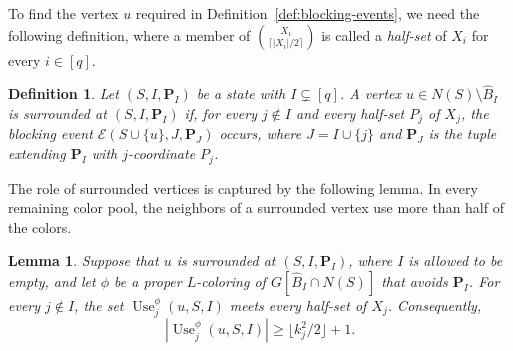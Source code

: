 \documentclass[10pt,a4paper]{amsart}
\numberwithin{equation}{section}
\newtheorem{lemma}[theorem]{Lemma}
\newtheorem{definition}[theorem]{Definition}
\newcommand{\Use}{\operatorname{Use}}
\begin{document}
To find the vertex $u$ required in
Definition~\ref{def:blocking-events}, we need the following definition,
where a member of
$\binom{X_i}{\lceil |X_i|/2\rceil}$ is called a \emph{half-set} of $X_i$
for every $i\in[q]$.

\begin{definition}\label{def:surrounded}
Let $(S,I,\mathbf{P}_I)$ be a state with $I \subsetneq [q]$. A vertex
$u \in N(S) \setminus \hat{B}_{I}$ is \emph{surrounded at}
$(S,I,\mathbf{P}_I)$ if, for every $j \notin I$ and every half-set $P_j$ of
$X_j$, the blocking event
$\mathcal{E}(S \cup \{u\},J,\mathbf{P}_J)$ occurs, where
$J = I \cup \{j\}$ and $\mathbf{P}_J$ is the tuple extending $\mathbf{P}_I$ with
$j$-coordinate $P_j$.
\end{definition}

The role of surrounded vertices is captured by the following lemma. In every
remaining color pool, the neighbors of a surrounded vertex use more than half
of the colors.

\begin{lemma}\label{lem:recursive-hit}
Suppose that $u$ is surrounded at
$(S,I,\mathbf{P}_I)$, where $I$ is allowed to be empty, and let $\phi$ be a
proper $L$-coloring of $G[\hat{B}_{I} \cap N(S)]$ that avoids
$\mathbf{P}_I$.
For every $j \notin I$, the set $\Use_j^\phi(u, S, I)$ meets every
half-set of $X_j$. Consequently,
\[
 |\Use_j^\phi(u, S, I)| \geq \lfloor k_j^2/2\rfloor + 1.
\]
\end{lemma}
\end{document}
